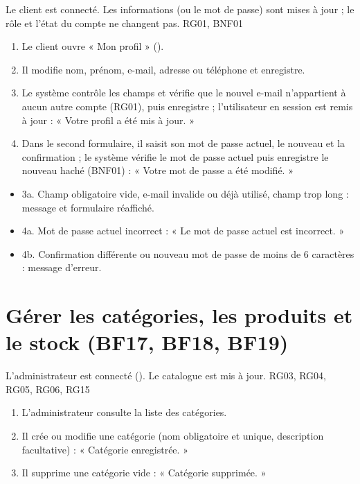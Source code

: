   {Le client est connecté.}
  {Les informations (ou le mot de passe) sont mises à jour ; le rôle et l'état du compte ne changent pas.}
  {RG01, BNF01}

\begin{enumerate}
  \item Le client ouvre « Mon profil » ().
  \item Il modifie nom, prénom, e-mail, adresse ou téléphone et enregistre.
  \item Le système contrôle les champs et vérifie que le nouvel e-mail n'appartient à aucun autre compte (RG01),
        puis enregistre ; l'utilisateur en session est remis à jour : « Votre profil a été mis à jour. »
  \item Dans le second formulaire, il saisit son mot de passe actuel, le nouveau et la confirmation ; le système
        vérifie le mot de passe actuel puis enregistre le nouveau haché (BNF01) : « Votre mot de passe a été
        modifié. »
\end{enumerate}

\begin{itemize}
  \item 3a. Champ obligatoire vide, e-mail invalide ou déjà utilisé, champ trop long : message et formulaire
        réaffiché.
  \item 4a. Mot de passe actuel incorrect : « Le mot de passe actuel est incorrect. »
  \item 4b. Confirmation différente ou nouveau mot de passe de moins de 6 caractères : message d'erreur.
\end{itemize}

\section{Gérer les catégories, les produits et le stock (BF17, BF18, BF19)}

  {L'administrateur est connecté ().}
  {Le catalogue est mis à jour.}
  {RG03, RG04, RG05, RG06, RG15}

\begin{enumerate}
  \item L'administrateur consulte la liste des catégories.
  \item Il crée ou modifie une catégorie (nom obligatoire et unique, description facultative) : « Catégorie
        enregistrée. »
  \item Il supprime une catégorie vide : « Catégorie supprimée. »
\end{enumerate}

